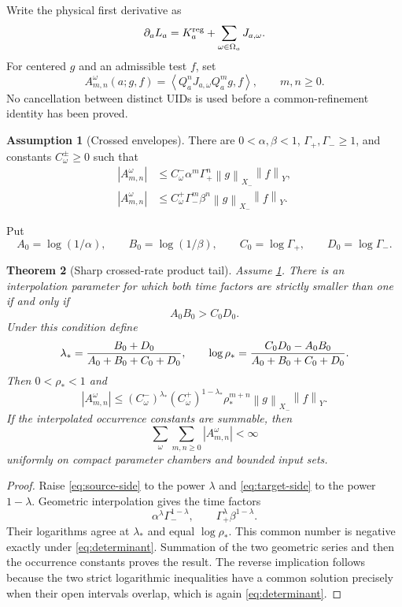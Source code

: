 \documentclass[11pt,reqno]{amsart}
\newtheorem{theorem}{Theorem}[section]
\theoremstyle{definition}
\newtheorem{assumption}[theorem]{Assumption}
\theoremstyle{remark}
\newcommand{\norm}[1]{\left\lVert #1\right\rVert}
\newcommand{\abs}[1]{\left\lvert #1\right\rvert}
\newcommand{\pair}[2]{\left\langle #1,#2\right\rangle}
\begin{document}
Write the physical first derivative as
\begin{equation}\label{eq:source}
 \partial_aL_a=K_a^{\rm reg}+\sum_{\omega\in\Omega_a}J_{a,\omega}.
\end{equation}
For centered $g$ and an admissible test $f$, set
\begin{equation}\label{eq:atom}
 A_{m,n}^{\omega}(a;g,f)
 =\pair{Q_a^nJ_{a,\omega}Q_a^m g}{f},
 \qquad m,n\ge0.
\end{equation}
No cancellation between distinct UIDs is used before a common-refinement
identity has been proved.

\begin{assumption}[Crossed envelopes]\label{ass:crossed}
There are $0<\alpha,\beta<1$, $\Gamma_+,\Gamma_-\ge1$, and constants
$C_\omega^\pm\ge0$ such that
\begin{align}
 \abs{A_{m,n}^{\omega}}
 &\le C_\omega^-\alpha^m\Gamma_+^n
       \norm g_{X_-}\norm f_Y,\label{eq:source-side}\\
 \abs{A_{m,n}^{\omega}}
 &\le C_\omega^+\Gamma_-^m\beta^n
       \norm g_{X_-}\norm f_Y.\label{eq:target-side}
\end{align}
\end{assumption}

Put
\[
 A_0=\log(1/\alpha),\qquad B_0=\log(1/\beta),\qquad
 C_0=\log\Gamma_+,\qquad D_0=\log\Gamma_-.
\]

\begin{theorem}[Sharp crossed-rate product tail]\label{thm:crossed}
Assume \cref{ass:crossed}.  There is an interpolation parameter for which both
time factors are strictly smaller than one if and only if
\begin{equation}\label{eq:determinant}
 A_0B_0>C_0D_0.
\end{equation}
Under this condition define
\[
 \lambda_*={B_0+D_0\over A_0+B_0+C_0+D_0},
 \qquad
 \log\rho_*={C_0D_0-A_0B_0\over A_0+B_0+C_0+D_0}.
\]
Then $0<\rho_*<1$ and
\begin{equation}\label{eq:product}
 \abs{A_{m,n}^{\omega}}
 \le (C_\omega^-)^{\lambda_*}(C_\omega^+)^{1-\lambda_*}
      \rho_*^{m+n}\norm g_{X_-}\norm f_Y.
\end{equation}
If the interpolated occurrence constants are summable, then
\[
 \sum_\omega\sum_{m,n\ge0}\abs{A_{m,n}^{\omega}}<\infty
\]
uniformly on compact parameter chambers and bounded input sets.
\end{theorem}

\begin{proof}
Raise \eqref{eq:source-side} to the power $\lambda$ and
\eqref{eq:target-side} to the power $1-\lambda$.  Geometric interpolation
gives the time factors
\[
 \alpha^\lambda\Gamma_-^{1-\lambda},
 \qquad
 \Gamma_+^\lambda\beta^{1-\lambda}.
\]
Their logarithms agree at $\lambda_*$ and equal $\log\rho_*$.  This common
number is negative exactly under \eqref{eq:determinant}.  Summation of the two
geometric series and then the occurrence constants proves the result.  The
reverse implication follows because the two strict logarithmic inequalities
have a common solution precisely when their open intervals overlap, which is
again \eqref{eq:determinant}.
\end{proof}
\end{document}
